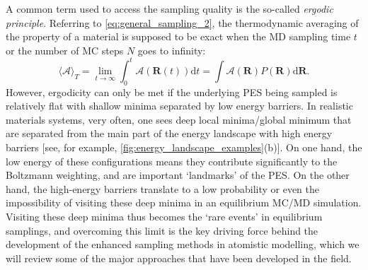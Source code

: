 A common term used to access the sampling quality is the so-called \emph{ergodic principle}. Referring to \cref{eq:general_sampling_2}, the thermodynamic averaging of the property of a material is supposed to be exact when the MD sampling time $t$ or the number of MC steps $N$ goes to infinity:
\begin{equation}
    \label{eq:ergody_condition}
    \langle\mathcal{A}\rangle_T=\lim_{t\to\infty}\int_0^t\mathcal{A}(\bm{R}(t))\mbox{d}t =\int \mathcal{A}(\bm{R}) P(\bm{R})\mbox{d}\bm{R}.
\end{equation}
However, ergodicity can only be met if the underlying PES being sampled is relatively flat with shallow minima separated by low energy barriers. In realistic materials systems, very often, one sees deep local minima/global minimum that are separated from the main part of the energy landscape with high energy barriers [see, for example, \cref{fig:energy_landscape_examples}(b)]. On one hand, the low energy of these configurations means they contribute significantly to the Boltzmann weighting, and are important `landmarks' of the PES. On the other hand, the high-energy barriers translate to a low probability or even the impossibility of visiting these deep minima in an equilibrium MC/MD simulation. Visiting these deep minima thus becomes the `rare events' in equilibrium samplings, and overcoming this limit is the key driving force behind the development of the enhanced sampling methods in atomistic modelling, which we will review some of the major approaches that have been developed in the field.